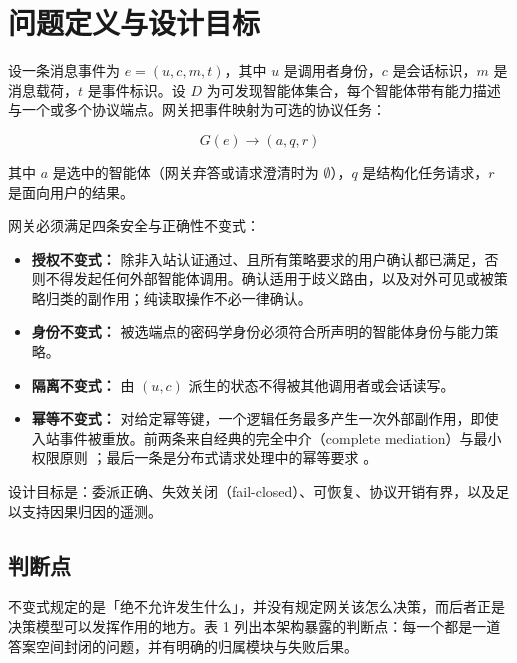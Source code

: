 \documentclass[11pt,a4paper]{article}
\begin{document}
\section{问题定义与设计目标}

设一条消息事件为 \(e=(u,c,m,t)\)，其中 \(u\) 是调用者身份，\(c\) 是会话标识，\(m\) 是消息载荷，\(t\) 是事件标识。设 \(D\) 为可发现智能体集合，每个智能体带有能力描述与一个或多个协议端点。网关把事件映射为可选的协议任务：

\begin{equation}
G(e) \rightarrow (a, q, r)
\end{equation}

其中 \(a\) 是选中的智能体（网关弃答或请求澄清时为 \(\emptyset\)），\(q\) 是结构化任务请求，\(r\) 是面向用户的结果。

网关必须满足四条安全与正确性不变式：

\begin{itemize}

\item \textbf{授权不变式：} 除非入站认证通过、且所有策略要求的用户确认都已满足，否则不得发起任何外部智能体调用。确认适用于歧义路由，以及对外可见或被策略归类的副作用；纯读取操作不必一律确认。

\item \textbf{身份不变式：} 被选端点的密码学身份必须符合所声明的智能体身份与能力策略。

\item \textbf{隔离不变式：} 由 \((u,c)\) 派生的状态不得被其他调用者或会话读写。

\item \textbf{幂等不变式：} 对给定幂等键，一个逻辑任务最多产生一次外部副作用，即使入站事件被重放。前两条来自经典的完全中介（complete mediation）与最小权限原则 \cite{saltzer1975protection}；最后一条是分布式请求处理中的幂等要求 \cite{helland2012idempotence}。

\end{itemize}

设计目标是：委派正确、失效关闭（fail-closed）、可恢复、协议开销有界，以及足以支持因果归因的遥测。

\subsection{判断点}

不变式规定的是「绝不允许发生什么」，并没有规定网关该怎么决策，而后者正是决策模型可以发挥作用的地方。表 1 列出本架构暴露的判断点：每一个都是一道答案空间封闭的问题，并有明确的归属模块与失败后果。
\end{document}

